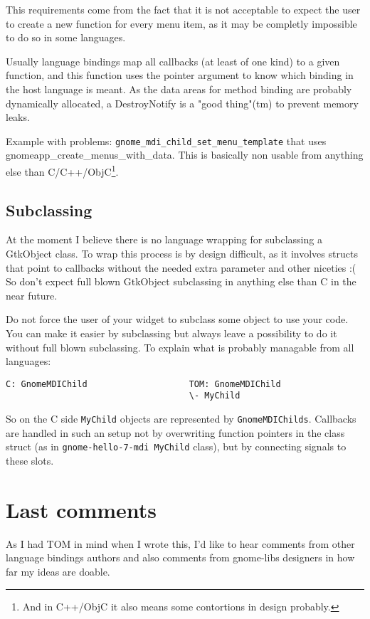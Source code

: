 \documentclass{article}
\begin{document}
This requirements come from the fact that it is not acceptable to
expect
the user to create a new function for every menu item, as it may be
completly impossible to do so in some languages.

Usually language bindings map all callbacks (at least of one kind) to a
    given function, and this function uses the pointer argument to
    know which binding in the host language is meant.  As the data
    areas for method binding are probably dynamically allocated, a
    DestroyNotify is a "good thing"(tm) to prevent memory leaks. 

Example with problems: {\tt gnome\_mdi\_child\_set\_menu\_template} that uses
    gnomeapp\_create\_menus\_with\_data. This is basically
    non usable from anything else than C/C++/ObjC\footnote{And in C++/ObjC it
    also means some contortions in design probably.}.

\subsection{Subclassing}
At the moment I believe there is
    no language wrapping for subclassing a GtkObject class. To wrap
    this process is by
    design difficult, as it involves structs that point to callbacks
    without the needed extra parameter and other niceties :( 
    So don't expect full blown GtkObject subclassing in anything else
    than C in the near future.

    Do not
    force the user of your widget to subclass some object to use your
    code. You can make it easier by subclassing but always leave a
    possibility to do it without full blown subclassing. To explain
    what is probably managable from all languages: 
\begin{verbatim}
C: GnomeMDIChild                    TOM: GnomeMDIChild 
                                    \- MyChild 
\end{verbatim}
So on the C side {\tt MyChild} objects are
    represented by {\tt GnomeMDIChilds}. Callbacks are handled in such an
    setup not by overwriting function pointers in the class struct (as
    in {\tt gnome-hello-7-mdi MyChild} class), but by connecting signals to
    these slots.

\section{Last comments}
As I had TOM in mind when I wrote this, I'd like to hear comments
from other language bindings authors and also comments from gnome-libs
designers in how far my ideas are doable.
\end{document}
